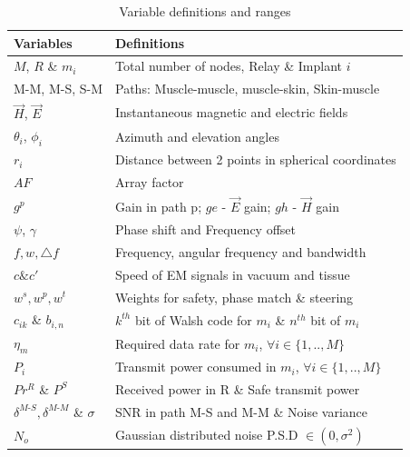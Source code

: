 \begin{table}[b]
\vspace{-6mm}
\centering
\caption{\label{tab:overview} Variable definitions and ranges}
\vspace{-3mm}
\footnotesize
\begin{tabular}{l|l}
\toprule
Variables & Definitions\\
\midrule
$M$, $R$ \& $m_i$ & Total number of nodes, Relay \&  Implant $i$ \\
M-M, M-S, S-M & Paths: Muscle-muscle, muscle-skin, Skin-muscle\\
$\overrightarrow{H}$, $\overrightarrow{E}$ & Instantaneous magnetic  and electric fields\\
$\theta_i$, $\phi_i$ & Azimuth and  elevation angles\\
$r_i$ & Distance between 2 points in spherical coordinates\\
$AF$ & Array factor\\
$g^p$ & Gain in path p;  $ge$ - $\overrightarrow{E}$ gain; $gh$ -  $\overrightarrow{H}$ gain \\
$\psi$, $\gamma$  & Phase shift and Frequency offset \\
$f,w,\triangle f$ & Frequency, angular frequency and bandwidth\\
$c \& c'$ & Speed of EM signals in vacuum and tissue \\
$w^s, w^p, w^t$ & Weights for safety, phase match \& steering \\
$c_{ik}$ \& $b_{i,n}$ & $k^{th}$ bit of Walsh code for $m_i$ 
\& $n^{th}$ bit of $m_i$\\
$\eta_m$ & Required data rate for $m_i$, $\forall i\in\{1,..,M\}$\\
$P_i$ & Transmit power consumed in $m_i$, $\forall i\in\{1,..,M\}$ \\
$Pr^R$ \& $P^S$ & Received  power in R \& Safe transmit power\\
$\delta^{M\text{-}S},\delta^{M\text{-}M}$ \& $\sigma$ & SNR in path M-S and M-M \& Noise variance\\
$N_o$ & Gaussian distributed noise P.S.D $\in (0,\sigma^2)$ \\
\bottomrule
\end{tabular}
\end{table}


